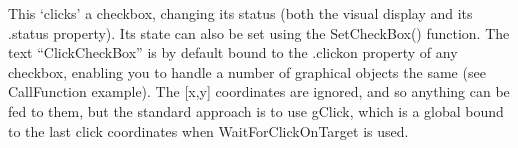 \documentclass[letterpaper,10pt,english]{sphinxmanual}
\begin{document}
\sphinxAtStartPar
This ‘clicks’ a checkbox, changing its status (both the visual display and its .status property). Its state can also be set using the SetCheckBox() function. The text “ClickCheckBox” is by default bound to the .clickon property of any checkbox, enabling you to handle a number of graphical objects the same (see CallFunction example). The {[}x,y{]} coordinates are ignored, and so anything can be fed to them, but the standard approach is to use gClick, which is a global bound to the last click coordinates when WaitForClickOnTarget is used.

\sphinxAtStartPar
{}

\begin{sphinxVerbatim}[commandchars=\\\{\}]
\PYG{p}{[}\PYG{p}{]}
\end{sphinxVerbatim}

\sphinxAtStartPar
{}
\end{document}

